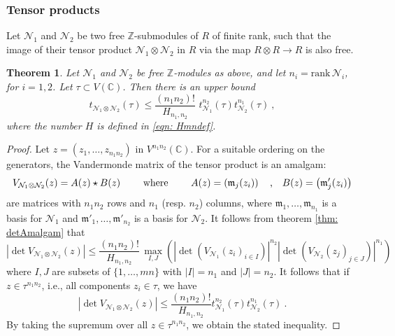 \documentclass[a4paper,10pt]{amsart}
\newtheorem{thm}{Theorem}[section]
\theoremstyle{definition}
\theoremstyle{remark}
\numberwithin{equation}{section}
\newcommand{\Z}{\mathbb Z}
\newcommand{\C}{\mathbb C}
\newcommand{\m}{\mathfrak{m}}
\newcommand{\rank}{\mathrm{rank}}
\newcommand{\0}{\color{blue}{\mathsf{0}}}
\begin{document}
  \subsubsection{Tensor products}
 
   Let $\mathcal{N}_1$ and $\mathcal{N}_2$ be  two   free $\Z$-submodules of $R$ of finite rank,  such that the image of their tensor product $\mathcal{N}_1 \otimes \mathcal{N}_2$  in $R$ via the map $R\otimes R \rightarrow R$ is also free.
  
  
    
  \begin{thm}   \label{thm: upperboundtau}
  Let  $\mathcal{N}_1$ and $\mathcal{N}_2$ be free $\Z$-modules as above, and let $n_i = \rank\, \mathcal{N}_i$, for $i=1, 2$. 
  Let $\tau \subset  V(\C)$. Then there is an upper bound 
  \[ 
  t_{\mathcal{N}_1 \otimes \mathcal{N}_2} (\tau ) \leq   \frac{(n_1n_2)!}{H_{n_1,n_2}} \, \,   t^{n_2}_{\mathcal{N}_1}(\tau)     t^{n_1}_{\mathcal{N}_2}(\tau)    \  , 
  \]
  where the number $H$ is defined in \eqref{eqn: Hmndef}. 
      \end{thm} 
  \begin{proof} Let $z=(z_1,\ldots, z_{n_1n_2})$ in $V^{n_1n_2}(\C)$. 
  For a suitable ordering on the generators, the Vandermonde matrix  of the tensor product is an amalgam: 
  \[ V_{\mathcal{N}_1 \otimes \mathcal{N}_2}(z)  =   A(z) \star   B(z) \qquad \hbox{ where } \qquad 
A(z) =  \left(  \m_j (z_i) \right) \quad \hbox{,} \quad B(z) =  \left(  \m'_j (z_i) \right)  \]
  are matrices with $n_1n_2$ rows and $n_1$ (resp. $n_2$) columns, 
  where $\m_1,\ldots, \m_{n_1}$ is a basis for $\mathcal{N}_1$ and $\m'_1,\ldots, \m'_{n_2}$ is a basis for $\mathcal{N}_2$. 
    It follows from theorem \ref{thm: detAmalgam} that
  \[   \left| \det  V_{\mathcal{N}_1 \otimes \mathcal{N}_2}(z) \right| \leq  \frac{(n_1n_2)!}{H_{n_1,n_2}}  \,   \max_{I,J}  \left( \left| \det(V_{\mathcal{N}_1}(z_i)_{i\in I}) \right|^{n_2}
   \left| \det(V_{\mathcal{N}_2}(z_j)_{j\in J}) \right|^{n_1}  \right)    \]
   where $I, J$ are subsets of $\{1,\ldots, mn\}$ with $|I|=n_1$ and $|J|=n_2$. It follows that if $z  \in \tau^{n_1n_2}$, i.e., all components $z_i \in \tau$,    we have
   \[    \left| \det  V_{\mathcal{N}_1 \otimes \mathcal{N}_2}(z) \right| \leq  \frac{(n_1n_2)!}{H_{n_1,n_2}}    t^{n_2}_{\mathcal{N}_1}(\tau)     t^{n_1}_{\mathcal{N}_2}(\tau)            \ .  \]
   By taking the supremum over all $z\in \tau^{n_1n_2}$, we obtain the stated inequality.
  \end{proof}
  
\end{document}
